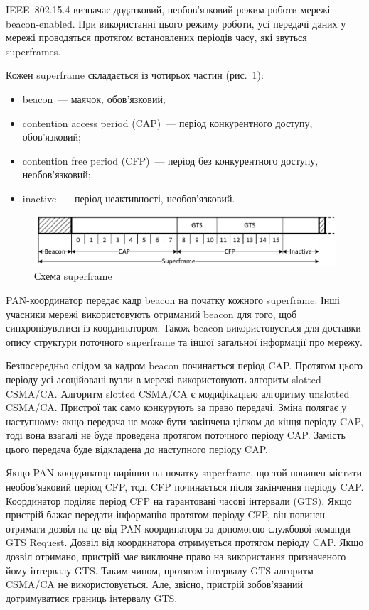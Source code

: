 \documentclass[a4paper,ukrainian,utf8,nocolumnsxix,nocolumnxxxii,nocolumnxxxi,floatsection,equationsection]{eskdtext}
\newcommand{\figref}[1]{рис.~\ref{#1}}
\newcommand{\iee}[0]{IEEE~802.15.4\xspace}
\newcommand{\csma}[0]{CSMA/CA\xspace}
\newcommand{\ucsma}[0]{unslotted \csma\xspace}
\newcommand{\scsma}[0]{slotted \csma\xspace}
\newcommand{\bem}[0]{beacon-enabled\xspace}
\begin{document}
\iee визначає додатковий, необов'язковий режим роботи мережі \bem. При використанні цього режиму роботи, усі передачі даних у мережі проводяться протягом встановлених періодів часу, які звуться superframes. 

Кожен superframe складається із чотирьох частин (\figref{fig:superframe}):

\begin{itemize}
	\item beacon~--- маячок, обов'язковий;
	\item contention access period (CAP)~--- період конкурентного доступу, обов'язковий;
	\item contention free period (CFP)~--- період без конкурентного доступу, необов'язковий;
	\item inactive~--- період неактивності, необов'язковий.
\end{itemize}

\begin{figure}[htbp]
	\centering
	\includegraphics[width=\textwidth]{img/superframe.pdf}
	\caption{\label{fig:superframe}Схема superframe}
\end{figure}

PAN-координатор передає кадр beacon на початку кожного superframe. Інші учасники мережі використовують отриманий beacon для того, щоб синхронізуватися із координатором. Також beacon використовується для доставки опису структури поточного superframe та іншої загальної інформації про мережу. 

Безпосередньо слідом за кадром beacon починається період CAP. Протягом цього періоду усі асоційовані вузли в мережі використовують алгоритм \scsma. Алгоритм \scsma є модифікацією алгоритму \ucsma. Пристрої так само конкурують за право передачі. Зміна полягає у наступному: якщо передача не може бути закінчена цілком до кінця періоду CAP, тоді вона взагалі не буде проведена протягом поточного періоду CAP. Замість цього передача буде відкладена до наступного періоду CAP. 

Якщо PAN-координатор вирішив на початку superframe, що той повинен містити необов'язковий період CFP, тоді CFP починається після закінчення періоду CAP. Координатор поділяє період CFP на гарантовані часові інтервали (GTS). Якщо пристрій бажає передати інформацію протягом періоду CFP, він повинен отримати дозвіл на це від PAN-координатора за допомогою службової команди GTS Request. Дозвіл від координатора отримується протягом періоду CAP. Якщо дозвіл отримано, пристрій має виключне право на використання призначеного йому інтервалу GTS. Таким чином, протягом інтервалу GTS алгоритм \csma не використовується. Але, звісно, пристрій зобов'язаний дотримуватися границь інтервалу GTS. 
\end{document}
